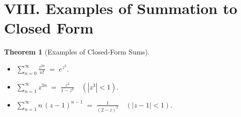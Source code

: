 \documentclass[12pt]{article}
\theoremstyle{plain}
\newtheorem{theorem}{Theorem}
\theoremstyle{definition}
\begin{document}
\section*{VIII. Examples of Summation to Closed Form}

\begin{theorem}[Examples of Closed-Form Sums]
\ 
\begin{itemize}
\item \(\displaystyle \sum_{n=0}^{\infty} \frac{z^{2n}}{n!} 
    \;=\;
    e^{z^2}.\)

\item \(\displaystyle \sum_{n=1}^{\infty} z^{3n}
    \;=\;
    \frac{z^3}{1 - z^3}
    \quad (|z^3|<1).\)

\item \(\displaystyle \sum_{n=1}^{\infty} n\,(z-1)^{n-1}
    \;=\;
    \frac{1}{(2 - z)^2}
    \quad (|z-1|<1).\)
\end{itemize}
\end{theorem}
\end{document}
